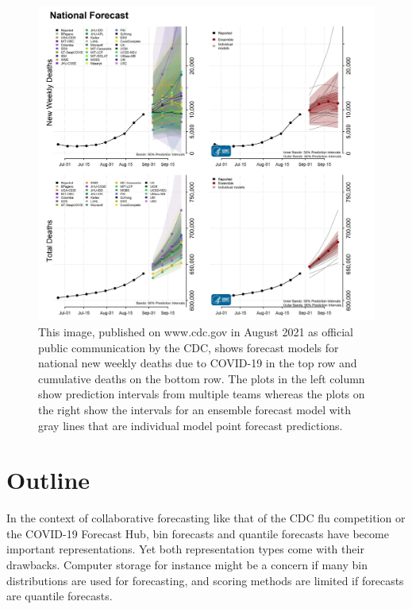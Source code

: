 \documentclass[11pt,notitlepage]{isuthesis}
\begin{document}
\begin{figure}[htbp]
\centerline{\includegraphics[scale=.24]{Images/8_30_21_cvd_deaths.jpeg}}
\begin{center}
\begin{minipage}{10cm}
\captionsetup{font=scriptsize}
\caption[Official CDC COVID-19 deaths report August 2021]{This image, 
published on www.cdc.gov in August 2021 as official public communication 
by the CDC, shows forecast models for national new weekly deaths due to COVID-19 
in the top row and cumulative deaths on the bottom row. The plots in the left 
column show prediction intervals from multiple teams whereas the plots on the 
right show the intervals for an ensemble forecast model with gray lines that are
individual model point forecast predictions.}
\label{fig:cdcoff}
\end{minipage}
\end{center}
\end{figure}

\section{Outline}
In the context of collaborative forecasting like that of the CDC flu competition
or the COVID-19 Forecast Hub, bin forecasts and quantile forecasts have become
important representations. Yet both 
representation types come 
with their drawbacks. Computer
storage for instance might be a concern if many bin distributions are used for 
forecasting, 
and scoring methods are limited if forecasts are quantile forecasts.
\end{document}
